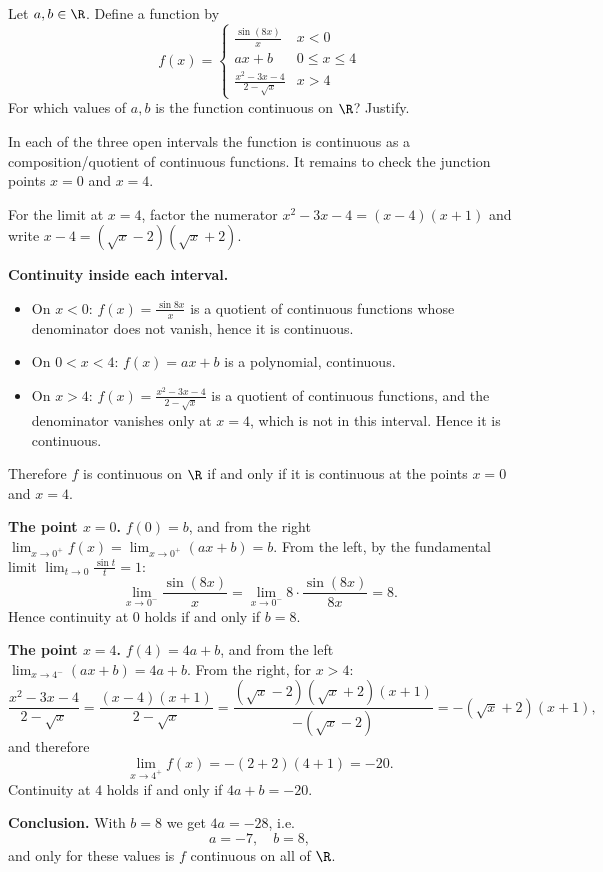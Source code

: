 
\begin{question}
Let $a,b\in\R$. Define a function by
\[ f(x)=\begin{cases} \frac{\sin(8x)}{x} & x<0\\[2pt] ax+b & 0\le x\le 4\\[2pt] \frac{x^2-3x-4}{2-\sqrt{x}} & x>4 \end{cases} \]
For which values of $a,b$ is the function continuous on $\R$? Justify.
\end{question}

\begin{hint}
In each of the three open intervals the function is continuous as a composition/quotient of continuous functions. It remains to check the junction points $x=0$ and $x=4$.
\end{hint}

\begin{hint}
For the limit at $x=4$, factor the numerator $x^2-3x-4=(x-4)(x+1)$ and write $x-4=(\sqrt x-2)(\sqrt x+2)$.
\end{hint}

\begin{solution}
\textbf{Continuity inside each interval.}
\begin{itemize}
  \item On $x<0$: $f(x)=\frac{\sin 8x}{x}$ is a quotient of continuous functions whose denominator does not vanish, hence it is continuous.
  \item On $0<x<4$: $f(x)=ax+b$ is a polynomial, continuous.
  \item On $x>4$: $f(x)=\frac{x^2-3x-4}{2-\sqrt x}$ is a quotient of continuous functions, and the denominator vanishes only at $x=4$, which is not in this interval. Hence it is continuous.
\end{itemize}
Therefore $f$ is continuous on $\R$ if and only if it is continuous at the points $x=0$ and $x=4$.

\textbf{The point $x=0$.} $f(0)=b$, and from the right $\lim_{x\to0^+}f(x)=\lim_{x\to0^+}(ax+b)=b$. From the left, by the fundamental limit $\lim_{t\to0}\frac{\sin t}{t}=1$:
\[ \lim_{x\to0^-}\frac{\sin(8x)}{x} = \lim_{x\to0^-}8\cdot\frac{\sin(8x)}{8x} = 8. \]
Hence continuity at $0$ holds if and only if $b=8$.

\textbf{The point $x=4$.} $f(4)=4a+b$, and from the left $\lim_{x\to4^-}(ax+b)=4a+b$. From the right, for $x>4$:
\[ \frac{x^2-3x-4}{2-\sqrt x} = \frac{(x-4)(x+1)}{2-\sqrt x} = \frac{(\sqrt x-2)(\sqrt x+2)(x+1)}{-(\sqrt x-2)} = -(\sqrt x+2)(x+1), \]
and therefore
\[ \lim_{x\to4^+}f(x) = -(2+2)(4+1) = -20. \]
Continuity at $4$ holds if and only if $4a+b=-20$.

\textbf{Conclusion.} With $b=8$ we get $4a=-28$, i.e.
\[ \boxed{a=-7,\quad b=8}, \]
and only for these values is $f$ continuous on all of $\R$.
\end{solution}
